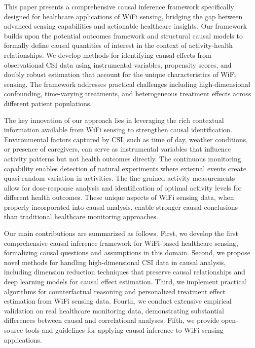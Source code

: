 \documentclass[journal]{IEEEtran}
\begin{document}
This paper presents a comprehensive causal inference framework specifically designed for healthcare applications of WiFi sensing, bridging the gap between advanced sensing capabilities and actionable healthcare insights. Our framework builds upon the potential outcomes framework and structural causal models to formally define causal quantities of interest in the context of activity-health relationships. We develop methods for identifying causal effects from observational CSI data using instrumental variables, propensity scores, and doubly robust estimation that account for the unique characteristics of WiFi sensing. The framework addresses practical challenges including high-dimensional confounding, time-varying treatments, and heterogeneous treatment effects across different patient populations.

The key innovation of our approach lies in leveraging the rich contextual information available from WiFi sensing to strengthen causal identification. Environmental factors captured by CSI, such as time of day, weather conditions, or presence of caregivers, can serve as instrumental variables that influence activity patterns but not health outcomes directly. The continuous monitoring capability enables detection of natural experiments where external events create quasi-random variation in activities. The fine-grained activity measurements allow for dose-response analysis and identification of optimal activity levels for different health outcomes. These unique aspects of WiFi sensing data, when properly incorporated into causal analysis, enable stronger causal conclusions than traditional healthcare monitoring approaches.

Our main contributions are summarized as follows. First, we develop the first comprehensive causal inference framework for WiFi-based healthcare sensing, formalizing causal questions and assumptions in this domain. Second, we propose novel methods for handling high-dimensional CSI data in causal analysis, including dimension reduction techniques that preserve causal relationships and deep learning models for causal effect estimation. Third, we implement practical algorithms for counterfactual reasoning and personalized treatment effect estimation from WiFi sensing data. Fourth, we conduct extensive empirical validation on real healthcare monitoring data, demonstrating substantial differences between causal and correlational analyses. Fifth, we provide open-source tools and guidelines for applying causal inference to WiFi sensing applications.
\end{document}
